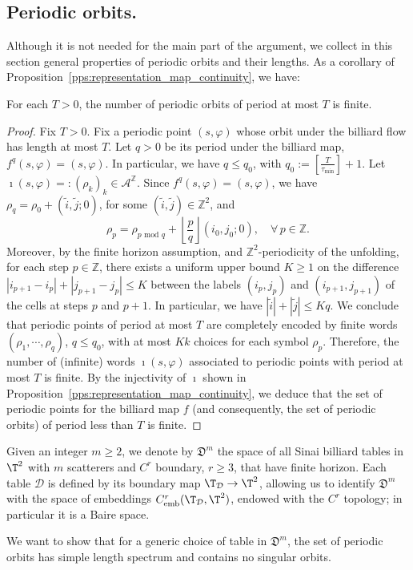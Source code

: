 \documentclass[reqno,11pt]{amsart}
\begin{document}
\subsection{Periodic orbits.}\label{ssec:periodic_orbits} 
\par Although it is not needed for the main part of the argument, we collect in this section general properties of periodic orbits and their lengths. 
As a corollary of Proposition~\ref{pps:representation_map_continuity}, we have:
\begin{corollary}\label{cor:fin_card_peri}
	For each \( T>0 \), the number of periodic orbits of period at most \( T \) is finite.
\end{corollary}
\begin{proof}
    Fix \( T>0 \). Fix a periodic point $(s,\varphi)$ whose orbit under the billiard flow has length at most $T$. Let $q>0$ be its period under the billiard map, $f^q(s,\varphi)=(s,\varphi)$. In particular, we have $q \leq q_0$, with \( q_0:=[\frac{T}{\tau_\mathrm{min}}]+1 \). Let \(\imath(s,\varphi)=:(\rho_k)_{k}\in \mathcal{A}^\mathbb{Z} \). 
    Since $f^q(s,\varphi)=(s,\varphi)$, we have $\rho_{q}=\rho_0+(\tilde i,\tilde j;0)$, for some $(\tilde i,\tilde j)\in \mathbb{Z}^2$, and 
    $$
    \rho_p=\rho_{p \text{ mod }q}+\left\lfloor \frac{p}{q}\right\rfloor(i_0,j_0;0),\quad \forall\, p \in \mathbb{Z}.
    $$
    Moreover, by the finite horizon assumption, and $\mathbb{Z}^2$-periodicity of the unfolding, for each step $p\in \mathbb{Z}$, there exists a uniform upper bound $K\geq 1$ on the difference $|i_{p+1}-i_p|+|j_{p+1}-j_p|\leq K$ between the labels $(i_p,j_p)$ and $(i_{p+1},j_{p+1})$ of the cells at steps $p$ and $p+1$. In particular, we have $|\tilde i|+|\tilde j|\leq K q$. We conclude that periodic points of period at most $T$ are completely encoded by finite words $(\rho_1,\cdots,\rho_q)$, $q\leq q_0$, with at most $Kk$ choices for each symbol $\rho_p$. Therefore, the number of (infinite) words $\imath(s,\varphi)$ associated to periodic points with period at most $T$ is finite. By the injectivity of $\imath$ shown in Proposition~\ref{pps:representation_map_continuity}, we deduce that the set of periodic points for the billiard map $f$ (and consequently, the set of periodic orbits) of period less than $T$ is finite. \qedhere
   
\end{proof}

Given an integer $m\geq 2$, we denote by \( \mathfrak{D}^m \) the space of all Sinai billiard tables in \( \T^2 \) with \( m \) scatterers and $C^r$ boundary, $r \geq 3$, that have finite horizon. 
Each table \( \mathcal{D} \) is defined by its boundary map \( \T_\mathcal{D} \to \T^2 \), allowing us to identify \( \mathfrak{D}^m \) with the space of embeddings \( C^r_{\text{emb}}(\T_\mathcal{D}, \T^2) \), endowed with the $C^r$ topology; in particular it is a Baire space. 
\par We want to show that for a generic choice of table in \( \mathfrak{D}^m \), the set of periodic orbits has simple length spectrum and contains no singular orbits. 
\end{document}
